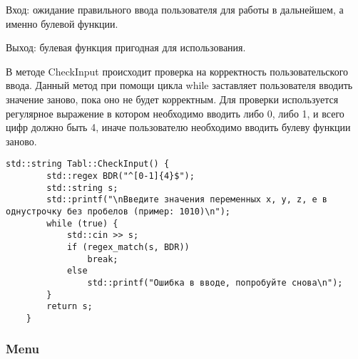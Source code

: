 \documentclass[10pt,a4paper,final]{article} %
\begin{document}
\par Вход: ожидание правильного ввода пользователя для работы в дальнейшем, а именно булевой функции.
\par Выход: булевая функция пригодная для использования.
\par В методе  CheckInput происходит проверка на корректность пользовательского ввода. Данный метод при помощи цикла while заставляет пользователя вводить значение заново, пока оно не будет корректным. Для проверки используется регулярное выражение в котором необходимо вводить либо 0, либо 1, и всего цифр должно быть 4, иначе  пользователю необходимо вводить булеву функции заново.
\begin{lstlisting}[caption={Метод CheckInput}]
	std::string Tabl::CheckInput() {
		std::regex BDR("^[0-1]{4}$");
		std::string s;
		std::printf("\nВведите значения переменных x, у, z, e в однустрочку без пробелов (пример: 1010)\n");
		while (true) {
			std::cin >> s;
			if (regex_match(s, BDR))
				break;
			else
				std::printf("Ошибка в вводе, попробуйте снова\n");
		}
		return s;
	}
\end{lstlisting}

\subsubsection{Menu}
\end{document}

